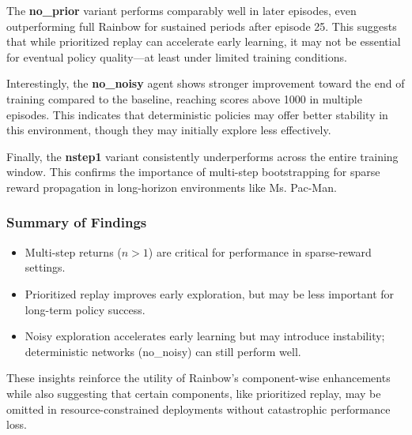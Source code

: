 \documentclass{article}
\begin{document}
The \textbf{no\_prior} variant performs comparably well in later episodes, even outperforming full Rainbow for sustained periods after episode 25. This suggests that while prioritized replay can accelerate early learning, it may not be essential for eventual policy quality—at least under limited training conditions.

Interestingly, the \textbf{no\_noisy} agent shows stronger improvement toward the end of training compared to the baseline, reaching scores above 1000 in multiple episodes. This indicates that deterministic policies may offer better stability in this environment, though they may initially explore less effectively.

Finally, the \textbf{nstep1} variant consistently underperforms across the entire training window. This confirms the importance of multi-step bootstrapping for sparse reward propagation in long-horizon environments like Ms. Pac-Man.

\subsubsection*{Summary of Findings}
\begin{itemize}
    \item Multi-step returns ($n > 1$) are critical for performance in sparse-reward settings.
    \item Prioritized replay improves early exploration, but may be less important for long-term policy success.
    \item Noisy exploration accelerates early learning but may introduce instability; deterministic networks (no\_noisy) can still perform well.
\end{itemize}

These insights reinforce the utility of Rainbow’s component-wise enhancements while also suggesting that certain components, like prioritized replay, may be omitted in resource-constrained deployments without catastrophic performance loss.


\end{document}
